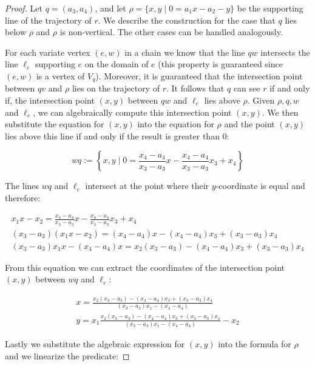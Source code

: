 \documentclass[UKenglish]{lipics-v2019}
\begin{document}
\begin{proof}
  Let $q = (a_3,a_4)$, and let $\rho = \{ x,y \mid 0 = a_1 x - a_2 - y \}$ be
  the supporting line of the trajectory of $r$. We describe the construction
  for the case that $q$ lies below $\rho$ and $\rho$ is non-vertical. The other
  cases can be handled analogously.

  For each variate vertex $(e,w)$ in a chain we know that the line $qw$
  intersects the line $\ell_e$ supporting $e$ on the domain of $e$ (this
  property is guaranteed since $(e,w)$ is a vertex of $V_q$). Moreover, it is
  guaranteed that the intersection point between $qv$ and $\rho$ lies on the
  trajectory of $r$. It follows that $q$ can see $r$ if and only if, the
  intersection point $(x,y)$ between $qw$ and $\ell_e$ lies above $\rho$. Given
  $\rho, q, w$ and $\ell_e$, we can algebraically compute this intersection
  point $(x,y)$. We then substitute the equation for $(x, y)$ into the equation
  for $\rho$ and the point $(x,y)$ lies above this line if and only if the
  result is greater than $0$:

\[
wq := \left\{x,y \mid 0 =  \frac{x_4 - a_4}{x_3 - a_3} x - \frac{x_4 - a_4}{x_3 - a_3}x_3 + x_4  \right\}
\]

The lines $wq$ and $\ell_e$ intersect at the point where their $y$-coordinate is equal and therefore:


\begin{align*}
    x_1 x - x_2 =  \frac{x_4 - a_4}{x_3 - a_3} x - \frac{x_4 - a_4}{x_3 - a_3}x_3 + x_4 \\
    (x_3 - a_3)(x_1 x - x_2) = (x_4 - a_4) x - (x_4 - a_4)x_3 + (x_3 - a_3) x_4 \\
    (x_3 - a_3)x_1 x - (x_4 - a_4) x = x_2 (x_3 - a_3) - (x_4 - a_4)x_3 + (x_3 - a_3) x_4 
\end{align*}


From this equation we can extract the coordinates of the intersection point $(x,y)$ between $wq$ and $\ell_e$:

\begin{align*}
    x = \frac{x_2 (x_3 - a_3) - (x_4 - a_4)x_3 + (x_3 - a_3) x_4}{ (x_3 - a_3)x_1 - (x_4 - a_4)} \\
    y = x_1 \frac{x_2 (x_3 - a_3) - (x_4 - a_4)x_3 + (x_3 - a_3) x_4}{ (x_3 - a_3)x_1 - (x_4 - a_4)} - x_2
\end{align*}

Lastly we substitute the algebraic expression for $(x,y)$ into the formula for $\rho$ and we linearize the predicate:


\end{proof}
\end{document}
